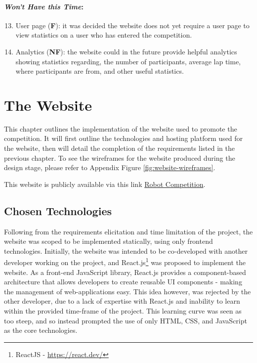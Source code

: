 \documentclass{l4proj}
\begin{document}
\subsubsection{\textit{Won't Have this Time}:}
\begin{enumerate}[label=A.\arabic*]
\setcounter{enumi}{12}
    \item User page (\textbf{F}): it was decided the website does not yet require a user page to view statistics on a user who has entered the competition.
    \item Analytics (\textbf{NF}): the website could in the future provide helpful analytics showing statistics regarding, the number of participants, average lap time, where participants are from, and other useful statistics.
\end{enumerate}


\chapter{The Website}
This chapter outlines the implementation of the website used to promote the competition. It will first outline the technologies and hosting platform used for the website, then will detail the completion of the requirements listed in the previous chapter. To see the wireframes for the website produced during the design stage, please refer to Appendix Figure \ref{fig:website-wireframes}.

This website is publicly available via this link \href{https://robot-competition.github.io/robot-competition/}{Robot Competition}.

\section{Chosen Technologies}
Following from the requirements elicitation and time limitation of the project, the website was scoped to be implemented statically, using only frontend technologies. Initially, the website was intended to be co-developed with another developer working on the project, and React.js\footnote{ReactJS - \url{https://react.dev/}} was proposed to implement the website. As a front-end JavaScript library, React.js provides a component-based architecture that allows developers to create reusable UI components - making the management of web-applications easy. This idea however, was rejected by the other developer, due to a lack of expertise with React.js and inability to learn within the provided time-frame of the project. This learning curve was seen as too steep, and so instead prompted the use of only HTML, CSS, and JavaScript as the core technologies. 
\end{document}
